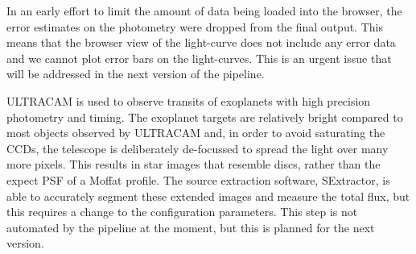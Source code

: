 In an early effort to limit the amount of data being loaded into the browser, the error estimates on the photometry were dropped from the final output. This means that the browser view of the light-curve does not include any error data and we cannot plot error bars on the light-curves. This is an urgent issue that will be addressed in the next version of the pipeline. 

ULTRACAM is used to observe transits of exoplanets with high precision photometry and timing. The exoplanet targets are relatively bright compared to most objects observed by ULTRACAM and, in order to avoid saturating the CCDs, the telescope is deliberately de-focussed to spread the light over many more pixels. This results in star images that resemble discs, rather than the expect PSF of a Moffat profile. The source extraction software, SExtractor, is able to accurately segment these extended images and measure the total flux, but this requires a change to the configuration parameters. This step is not automated by the pipeline at the moment, but this is planned for the next version. 


